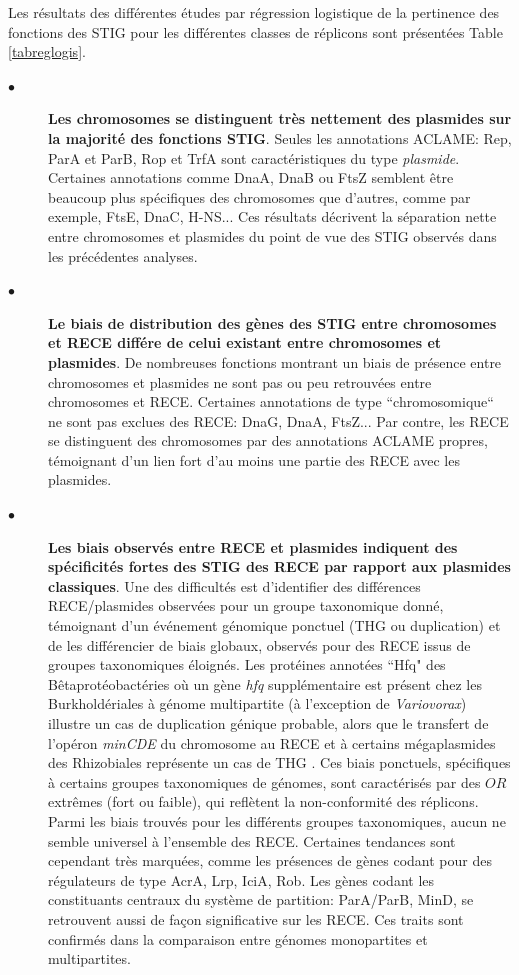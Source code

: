 	Les résultats des différentes études par régression logistique de la pertinence des fonctions des STIG pour les différentes classes de réplicons sont présentées Table \ref{tabreglogis}.

\begin{description}
\item[$\bullet$] \textbf{Les chromosomes se distinguent très nettement des plasmides sur la majorité des fonctions STIG}. Seules les annotations ACLAME: Rep, ParA et ParB, Rop et TrfA sont caractéristiques du type \textit{plasmide}. Certaines annotations comme DnaA, DnaB ou FtsZ semblent être beaucoup plus spécifiques des chromosomes que d'autres, comme par exemple, FtsE, DnaC, H-NS... Ces résultats décrivent la séparation nette entre chromosomes et plasmides du point de vue des STIG observés dans les précédentes analyses. 

\item[$\bullet$] \textbf{Le biais de distribution des gènes des STIG entre chromosomes et RECE différe de celui existant entre chromosomes et plasmides}. De nombreuses fonctions montrant un biais de présence entre chromosomes et plasmides ne sont pas ou peu retrouvées entre chromosomes et RECE. Certaines annotations de type “chromosomique“ ne sont pas exclues des RECE: DnaG, DnaA, FtsZ... Par contre, les RECE se distinguent des chromosomes par des annotations ACLAME propres, témoignant d'un lien fort d'au moins une partie des RECE avec les plasmides.

\item[$\bullet$] \textbf{Les biais observés entre RECE et plasmides indiquent des spécificités fortes des STIG des RECE par rapport aux plasmides classiques}. Une des difficultés est d'identifier des différences RECE/plasmides observées pour un groupe taxonomique donné, témoignant d'un événement génomique ponctuel (THG ou duplication) et de les différencier de biais globaux, observés pour des RECE issus de groupes taxonomiques éloignés. Les protéines annotées ``Hfq" des Bêtaprotéobactéries où un gène \textit{hfq} supplémentaire est présent chez les Burkholdériales à génome multipartite (à l'exception de \textit{Variovorax}) illustre un cas de duplication génique probable, alors que le transfert de l'opéron \textit{minCDE} du chromosome au RECE et à certains mégaplasmides des Rhizobiales représente un cas de THG  \citep{Slater2009}. Ces biais ponctuels, spécifiques à certains groupes taxonomiques de génomes, sont caractérisés par des $OR$ extrêmes (fort ou faible), qui reflètent la non-conformité des réplicons. Parmi les biais trouvés pour les différents groupes taxonomiques, aucun ne semble universel à l'ensemble des RECE. Certaines tendances sont cependant très marquées, comme les présences de gènes codant pour des régulateurs de type AcrA, Lrp, IciA, Rob. Les gènes codant les constituants centraux du système de partition: ParA/ParB, MinD, se retrouvent aussi de façon significative sur les RECE. Ces traits sont confirmés dans la comparaison entre génomes monopartites et multipartites.


\end{description}
